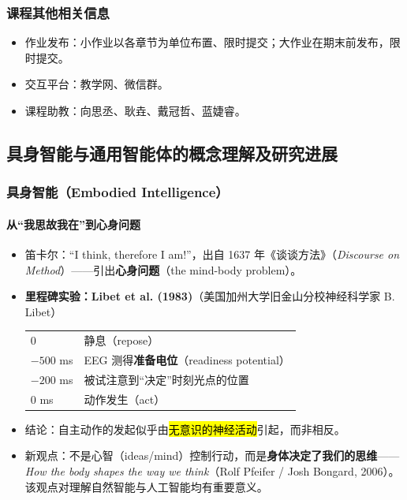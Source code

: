 \subsubsection{课程其他相关信息}

\begin{itemize}[itemsep=2pt]
    \item 作业发布：小作业以各章节为单位布置、限时提交；大作业在期末前发布，限时提交。
    \item 交互平台：教学网、微信群。
    \item 课程助教：向思丞、耿垚、戴冠哲、蓝婕睿。
\end{itemize}

\subsection{具身智能与通用智能体的概念理解及研究进展}

\subsubsection{具身智能（Embodied Intelligence）}

\paragraph{从“我思故我在”到心身问题}

\begin{itemize}[itemsep=2pt]
    \item 笛卡尔：“I think, therefore I am!”，出自 1637 年《谈谈方法》（\textit{Discourse on Method}）——引出\textbf{心身问题}（the mind-body problem）。
    \item \textbf{里程碑实验：Libet et al. (1983)}（美国加州大学旧金山分校神经科学家 B. Libet）

    \begin{tabular}{@{}ll@{}}
        $0$ & 静息（repose） \\
        $-500$ ms & EEG 测得\textbf{准备电位}（readiness potential） \\
        $-200$ ms & 被试注意到“决定”时刻光点的位置 \\
        $0$ ms & 动作发生（act） \\
    \end{tabular}

    \item 结论：自主动作的发起似乎由\hl{无意识的神经活动}引起，而非相反。
    \item 新观点：不是心智（ideas/mind）控制行动，而是\textbf{身体决定了我们的思维}——\textit{How the body shapes the way we think}（Rolf Pfeifer / Josh Bongard, 2006）。该观点对理解自然智能与人工智能均有重要意义。
\end{itemize}

